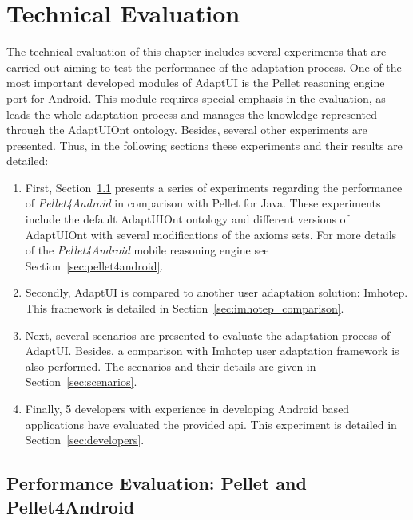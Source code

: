 \section{Technical Evaluation}
\label{sec:technical_evaluation}

The technical evaluation of this chapter includes several experiments that are 
carried out aiming to test the performance of the adaptation process. One of 
the most important developed modules of AdaptUI is the Pellet reasoning 
engine port for Android. This module requires special emphasis in the evaluation, 
as leads the whole adaptation process and manages the knowledge represented 
through the AdaptUIOnt ontology. Besides, several other experiments are 
presented. Thus, in the following sections these experiments and their results 
are detailed:


\begin{enumerate}[label=\alph*)]
  \item First, Section~\ref{sec:performance_evaluation} presents a series 
  of experiments regarding the performance of \textit{Pellet4Android} in 
  comparison with Pellet for Java. These experiments include the default
  AdaptUIOnt ontology and different versions of AdaptUIOnt with several modifications
  of the axioms sets. For more details of the \textit{Pellet4Android} mobile 
  reasoning engine see Section~\ref{sec:pellet4android}.
  
  \item Secondly, AdaptUI is compared to another user adaptation solution: 
  Imhotep. This framework is detailed in Section~\ref{sec:imhotep_comparison}.
  
  \item Next, several scenarios are presented to evaluate the adaptation 
  process of AdaptUI. Besides, a comparison with Imhotep user adaptation 
  framework is also performed. The scenarios and their details are given in 
  Section~\ref{sec:scenarios}.
  
  \item Finally, 5 developers with experience in developing Android based 
  applications have evaluated the provided \acs{api}. This experiment is detailed
  in Section~\ref{sec:developers}.
\end{enumerate}


\subsection{Performance Evaluation: Pellet and Pellet4Android}
\label{sec:performance_evaluation}

